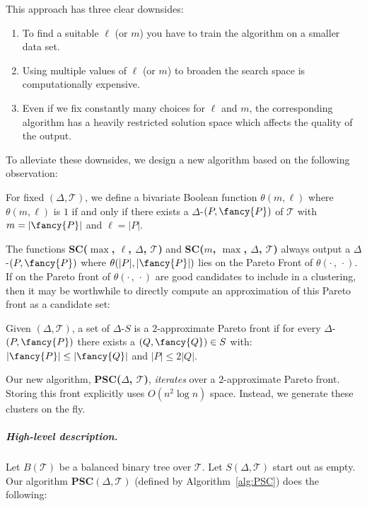 \documentclass[english, thm-restate]{lipics-v2021}
\begin{document}
This approach has three clear downsides:

\begin{enumerate}
    \item To find a suitable $\ell$ (or $m$) you have to train the algorithm on a smaller data set. 
    \item Using multiple values of $\ell$ (or $m$) to broaden the search space is computationally expensive. 
    \item Even if we fix constantly many choices for $\ell$ and $m$, the corresponding algorithm has a heavily restricted solution space which affects the quality of the output. 
\end{enumerate}

\noindent
To alleviate these downsides, we design a new algorithm based on the following observation: 

\begin{definition}
    For fixed $(\Delta, \mathcal{T})$, we define a bivariate Boolean function $\theta(m, \ell)$ where $\theta(m, \ell)$ is $1$ if and only if there exists a $\Delta$-\pathlet $(P, {\fancy{P}})$ of $\mathcal{T}$ with $m = |{\fancy{P}}|$ and $\ell = |P|$.  
\end{definition}

\noindent
The functions \textbf{SC($\max$, $\ell$, $\Delta$, $\mathcal{T}$)} and
\textbf{SC($m$, $\max$, $\Delta$, $\mathcal{T}$)} always output a $\Delta$-\pathlet $(P, {\fancy{P}})$ where $\theta(|P|, |{\fancy{P}}|)$ lies on the Pareto Front of $\theta(\cdot \, , \,  \cdot)$. 
If \pathlets on the Pareto front of $\theta(\cdot \, , \,  \cdot)$ are good candidates to include in a clustering, then it may be worthwhile to directly compute an approximation of this Pareto front as a candidate set:

\begin{definition}
    Given $(\Delta, \mathcal{T})$, a set of $\Delta$-\pathlets $S$ is a $2$-approximate Pareto front if for every $\Delta$-\pathlet $(P, {\fancy{P}})$ there exists a $(Q, {\fancy{Q}}) \in S$ with:
    $|{\fancy{P}}| \leq |{\fancy{Q}}| $ and $|P| \leq 2 |Q|$.
\end{definition}

\noindent
Our new algorithm,  \textbf{PSC($\Delta$, $\mathcal{T}$)}, \emph{iterates} over a $2$-approximate Pareto front. 
Storing this front explicitly uses $O(n^2 \log n)$ space. Instead, we generate these clusters on the fly.  

\subparagraph{High-level description.}
Let $B(\mathcal{T})$ be a balanced binary tree over $\mathcal{T}$.
Let $S(\Delta, \mathcal{T})$ start out as empty. Our algorithm \textbf{PSC}$(\Delta, \mathcal{T})$  (defined by Algorithm~\ref{alg:PSC}) does the following: 
\end{document}

